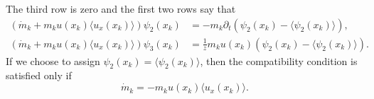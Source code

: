 \documentclass[english,master]{liumaiex}
\theoremstyle{thesisplain}
\theoremstyle{thesisdefinition}
\numberwithin{equation}{section}
\begin{document}
The third row is zero and the first two rows say that
\begin{equation}
\begin{aligned}
	(\dot{m}_k + m_ku(x_k) \langle u_x(x_k) \rangle) \psi_2(x_k) &= -m_k \partial_t (\psi_2(x_k) - \langle \psi_2(x_k) \rangle), \\
	(\dot{m}_k + m_ku(x_k) \langle u_x(x_k) \rangle) \psi_3(x_k) &= \frac{1}{z}m_k u(x_k) (\psi_2(x_k) - \langle \psi_2(x_k) \rangle).
\end{aligned}
\end{equation}
If we choose to assign $\psi_2(x_k) = \langle \psi_2(x_k) \rangle$, then the compatibility condition is satisfied only if
\begin{equation}
	\dot{m}_k = -m_k u(x_k) \langle u_x(x_k) \rangle.
\end{equation}

%
%
\newpage


\end{document}
